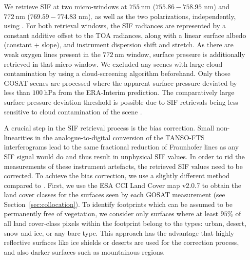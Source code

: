 \documentclass[preprint, a4paper, 10pt, times]{elsarticle}
\begin{document}
We retrieve SIF at two micro-windows at $755\:\mathrm{nm}$ ($755.86 - 758.95$ nm) and $772\:\mathrm{nm}$ ($769.59 - 774.83$ nm), as well as the two polarizations, independently, using \citet{Frankenberg2011}. For both retrieval windows, the SIF radiances are represented by a constant additive offset to the TOA radiances, along with a linear surface albedo (constant + slope), and instrument dispersion shift and stretch. As there are weak oxygen lines present in the $772\:\mathrm{nm}$ window, surface pressure is additionally retrieved in that micro-window. We excluded any scenes with large cloud contamination by using a cloud-screening algorithm beforehand. Only those GOSAT scenes are processed where the apparent surface pressure deviated by less than $100\:\mathrm{hPa}$ from the ERA-Interim prediction. The comparatively large surface pressure deviation threshold is possible due to SIF retrievals being less sensitive to cloud contamination of the scene \citep{frankenberg2012remote}.

A crucial step in the SIF retrieval process is the bias correction. Small non-linearities in the analogue-to-digital conversion of the TANSO-FTS interferograms lead to the same fractional reduction of Fraunhofer lines as any SIF signal would do and thus result in unphysical SIF values. In order to rid the measurements of these instrument artefacts, the retrieved SIF values need to be corrected. To achieve the bias correction, we use a slightly different method compared to \citet{Frankenberg2011}. First, we use the ESA CCI Land Cover map v2.0.7 \citep{Bontemps2013} to obtain the land cover classes for the surfaces seen by each GOSAT measurement (see Section~\ref{sec:collocation}). To identify footprints which can be assumed to be permanently free of vegetation, we consider only surfaces where at least $95\%$ of all land cover-class pixels within the footprint belong to the types: urban, desert, snow and ice, or any bare type. This approach has the advantage that highly reflective surfaces like ice shields or deserts are used for the correction process, and also darker surfaces such as mountainous regions.
\end{document}

